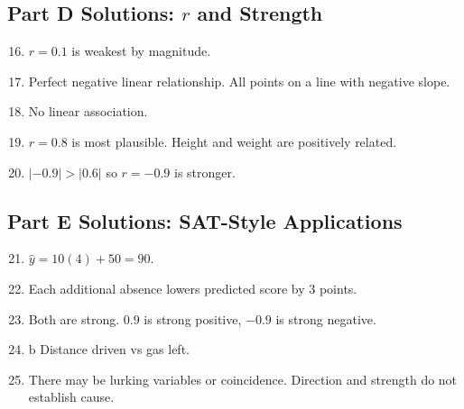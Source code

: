 \documentclass[14pt]{extarticle}
\begin{document}
\subsection*{Part D Solutions: \(r\) and Strength}
\begin{enumerate}
  \setcounter{enumi}{15}
  \item \(r=0.1\) is weakest by magnitude.
  \item Perfect negative linear relationship. All points on a line with negative slope.
  \item No linear association.
  \item \(r=0.8\) is most plausible. Height and weight are positively related.
  \item \(|-0.9|>|0.6|\) so \(r=-0.9\) is stronger.
\end{enumerate}

\subsection*{Part E Solutions: SAT-Style Applications}
\begin{enumerate}
  \setcounter{enumi}{20}
  \item \(\hat{y}=10(4)+50=90\).
  \item Each additional absence lowers predicted score by 3 points.
  \item Both are strong. \(0.9\) is strong positive, \(-0.9\) is strong negative.
  \item \(\boxed{\text{b}}\) Distance driven vs gas left.
  \item There may be lurking variables or coincidence. Direction and strength do not establish cause.
\end{enumerate}




\end{document}
